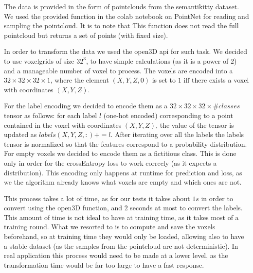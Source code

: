 The data is provided in the form of pointclouds from the semantikitty dataset. We used the provided
function in the colab notebook on PointNet for reading and sampling the pointcloud. It is to note that This function
does not read the full pointcloud but returns a set of points (with fixed size).\par
In order to transform the data we used the open3D api for such task. We decided to use voxelgrids of size $32^3$,
 to have simple calculations (as it is a power of $2$) and a manageable number of voxel to process.
The voxels are encoded into a $32\times32\times32\times1$, where the element $(X,Y,Z,0)$ is set to $1$ iff there exists a voxel with coordinates $(X,Y,Z)$.\par
For the label encoding we decided to encode them as a $32\times32\times32\times\#classes$ tensor as
follows:
for each label $l$ (one-hot encoded) corresponding to a point contained in the voxel with coordinates
$(X,Y,Z)$, the value of the tensor is updated as $labels(X,Y,Z,:)+=l$. After iterating over all the labels the labels tensor is normalized so that the features correspond to a probability distribution. For empty voxels we decided to encode them as a fictitious class. This is done only in order for
the crossEntropy loss to work correcly (as it expects a distribution). This encoding only happens 
at runtime for prediction and loss, as we the algorithm already knows what voxels are empty and
which ones are not.\par
This process takes a lot of time, as for our tests it takes about $1s$ in order to convert
using the open3D function, and 2 seconds at most to convert the labels. This amount of time
is not ideal to have at training time, as it takes most of a training round. 
What we resorted to is to compute and save the voxels beforehand, so at training time 
they would only be loaded, allowing also to have a stable dataset (as the samples from the pointcloud
are not deterministic). In real application this process would need to be made at a lower level, 
as the transformation time would be far too large to have a fast response.
